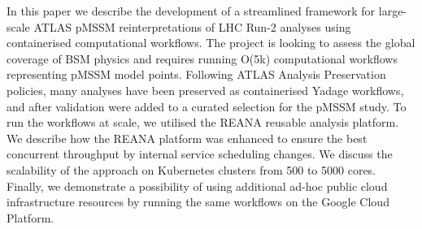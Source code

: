 In this paper we describe the development of a streamlined framework for large-scale ATLAS pMSSM reinterpretations of LHC Run-2 analyses using containerised computational workflows.
The project is looking to assess the global coverage of BSM physics and requires running O(5k) computational workflows representing pMSSM model points.
Following ATLAS Analysis Preservation policies, many analyses have been preserved as containerised Yadage workflows, and after validation were added to a curated selection for the pMSSM study.
To run the workflows at scale, we utilised the REANA reusable analysis platform. We describe how the REANA platform was enhanced to ensure the best concurrent throughput by internal service scheduling changes.
We discuss the scalability of the approach on Kubernetes clusters from 500 to 5000 cores.
Finally, we demonstrate a possibility of using additional ad-hoc public cloud infrastructure resources by running the same workflows on the Google Cloud Platform.

